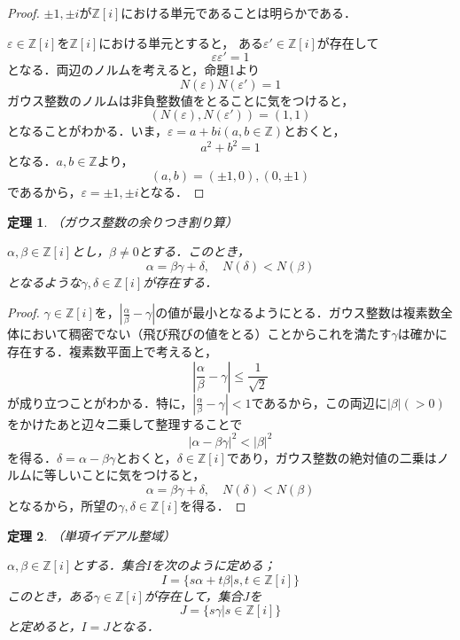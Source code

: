 \documentclass[dvipdfmx]{jsarticle}
\newtheorem{theorem}{定理}
\begin{document}
\begin{proof}
$\pm1,\pm i$が$\mathbb{Z}[i]$における単元であることは明らかである．

$\varepsilon\in\mathbb{Z}[i]$を$\mathbb{Z}[i]$における単元とすると，
ある$\varepsilon'\in\mathbb{Z}[i]$が存在して
$$\varepsilon\varepsilon'=1$$
となる．両辺のノルムを考えると，命題1より
$$N(\varepsilon)N(\varepsilon')=1$$
ガウス整数のノルムは非負整数値をとることに気をつけると，
$$(N(\varepsilon),N(\varepsilon'))=(1,1)$$
となることがわかる．いま，$\varepsilon=a+bi(a,b\in\mathbb{Z})$とおくと，
$$a^2+b^2=1$$
となる．$a,b\in\mathbb{Z}$より，
$$(a,b)=(\pm1,0),(0,\pm1)$$
であるから，$\varepsilon=\pm1,\pm i$となる．
\end{proof}

\begin{theorem}{（ガウス整数の余りつき割り算）}

$\alpha,\beta\in\mathbb{Z}[i]$とし，$\beta\neq0$とする．このとき，
$$\alpha=\beta\gamma+\delta,\quad N(\delta)<N(\beta)$$
となるような$\gamma,\delta\in\mathbb{Z}[i]$が存在する．
\end{theorem}

\begin{proof}
$\gamma\in\mathbb{Z}[i]$を，$\left|\frac{\alpha}{\beta}-\gamma\right|$の値が最小となるようにとる．ガウス整数は複素数全体において稠密でない（飛び飛びの値をとる）ことからこれを満たす$\gamma$は確かに存在する．複素数平面上で考えると，
$$\left|\frac{\alpha}{\beta}-\gamma\right|\leq\frac{1}{\sqrt{2}}$$
が成り立つことがわかる．特に，$\left|\frac{\alpha}{\beta}-\gamma\right|<1$であるから，この両辺に$|\beta|(>0)$をかけたあと辺々二乗して整理することで
$$|\alpha-\beta\gamma|^2<|\beta|^2$$
を得る．$\delta=\alpha-\beta\gamma$とおくと，$\delta\in\mathbb{Z}[i]$であり，ガウス整数の絶対値の二乗はノルムに等しいことに気をつけると，
$$\alpha=\beta\gamma+\delta,\quad N(\delta)<N(\beta)$$
となるから，所望の$\gamma,\delta\in\mathbb{Z}[i]$を得る．
\end{proof}

\begin{theorem}{（単項イデアル整域）}

$\alpha,\beta\in\mathbb{Z}[i]$とする．集合$I$を次のように定める；
$$I=\{s\alpha+t\beta|s,t\in\mathbb{Z}[i]\}$$
このとき，ある$\gamma\in\mathbb{Z}[i]$が存在して，集合$J$を
$$J=\{s\gamma|s\in\mathbb{Z}[i]\}$$
と定めると，$I=J$となる．
\end{theorem}
\end{document}
